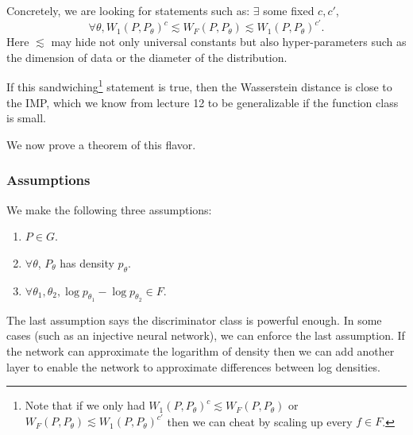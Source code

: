 \documentclass[11pt]{article}
\begin{document}
Concretely, we are looking for statements such as:  $\exists$ some fixed $c,c'$, 
$$\forall \theta, W_1(P,P_{\theta})^c \lesssim W_F(P,P_\theta)\lesssim W_1(P,P_\theta)^{c'}.$$ Here $\lesssim$ may hide not only universal constants but also hyper-parameters such as the dimension of data or the diameter of the distribution.

If this sandwiching\footnote{Note that if we only had $W_1(P,P_{\theta})^c \lesssim W_F(P,P_\theta)$ or $W_F(P,P_\theta)\lesssim W_1(P,P_\theta)^{c'}$ then we can cheat by scaling up every $f \in F$.} statement is true, then the Wasserstein distance is close to the IMP, which we know from lecture 12 to be generalizable if the function class is small.

We now prove a theorem of this flavor.

\subsubsection*{Assumptions}
We make the following three assumptions:
\begin{enumerate}
\item $P\in G$.
\item $\forall \theta$, $P_\theta$ has density $p_\theta$.
\item $\forall \theta_1,\theta_2, \log p_{\theta_1}-\log p_{\theta_2} \in F$.
\end{enumerate}

The last assumption says the discriminator class is  powerful enough. In some cases (such as an injective neural network), we can enforce the last assumption. If the network can approximate the logarithm of density then we can add another layer to enable the network to approximate differences between log densities.
\end{document}
